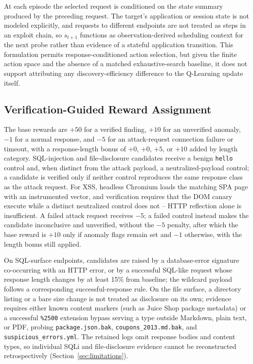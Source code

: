 \documentclass[conference, a4paper]{IEEEtran}
\begin{document}
At each episode the selected request is conditioned on the state
summary produced by the preceding request. The target's application
or session state is not modeled explicitly, and requests to
different endpoints are not treated as steps in an exploit chain, so
$s_{t+1}$ functions as observation-derived scheduling context for
the next probe rather than evidence of a stateful application
transition. This formulation permits response-conditioned action
selection, but given the finite action space and the absence of a
matched exhaustive-search baseline, it does not support attributing
any discovery-efficiency difference to the Q-Learning update itself.

\subsection{Verification-Guided Reward Assignment}
\label{sec:verification}

The base rewards are $+50$ for a verified finding, $+10$ for an
unverified anomaly, $-1$ for a normal response, and $-5$ for an
attack-request connection failure or timeout, with a
response-length bonus of $+0$, $+0$, $+5$, or $+10$ added by length
category. SQL-injection and file-disclosure candidates receive a
benign \texttt{hello} control and, when distinct from the attack
payload, a neutralized-payload control; a candidate is verified only
if neither control reproduces the same response class as the attack
request. For XSS, headless Chromium loads the matching SPA page with
an instrumented vector, and verification requires that the DOM
canary execute while a distinct neutralized control does not -- HTTP
reflection alone is insufficient. A failed attack request receives
$-5$; a failed control instead makes the candidate inconclusive and
unverified, without the $-5$ penalty, after which the base reward is
$+10$ only if anomaly flags remain set and $-1$ otherwise, with the
length bonus still applied.

On SQL-surface endpoints, candidates are raised by a database-error
signature co-occurring with an HTTP error, or by a successful
SQL-like request whose response length changes by at least 15\%
from baseline; the wildcard payload follows a corresponding
successful-response rule. On the file surface, a directory listing
or a bare size change is not treated as disclosure on its own;
evidence requires either known content markers (such as Juice Shop
package metadata) or a successful \texttt{\%2500} extension bypass
serving a type outside Markdown, plain text, or PDF, probing
\texttt{package.json.bak}, \texttt{coupons\_2013.md.bak}, and
\texttt{suspicious\_errors.yml}. The retained logs omit response
bodies and content types, so individual SQLi and file-disclosure
evidence cannot be reconstructed retrospectively (Section~\ref{sec:limitations}).
\end{document}
